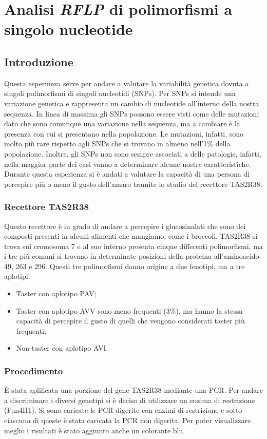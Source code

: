 \section*{Analisi \emph{RFLP} di polimorfismi a singolo nucleotide}

	\subsection*{Introduzione}
	Questa esperineza serve per andare a valutare la variabilità genetica dovuta a singoli polimorfismi di singoli nucleotidi (SNPs). Per SNPs si intende una variazione genetica e rappresenta un cambio di nucleotide all'interno della nostra sequenza. In linea di massima gli SNPs possono essere visti come delle mutazioni dato che sono comunque una variazione nella sequenza, ma a cambiare è la presenza con cui si presentano nella popolazione. Le mutazioni, infatti, sono molto più rare  rispetto agli SNPs che si trovano in almeno nell'1$\%$ della popolazione. Inoltre, gli SNPs non sono sempre associati a delle patologie, infatti, nella maggior parte dei casi vanno a determinare alcune nostre caratteristiche. 
	Durante questa esperienza si è andati a valutare la capacità di una persona di percepire più o meno il gusto dell'amaro tramite lo studio del recettore TAS2R38. 
	
	    \subsubsection*{Recettore TAS2R38}
	    Questo recettore è in grado di andare a percepire i glucosinalati che sono dei composti presenti in alcuni alimenti che mangiamo, come i broccoli. 
	    TAS2R38 si trova sul cromosoma 7 e al suo interno presenta cinque differenti polimorfismi, ma i tre più comuni si trovano in determinate posizioni della proteina all'aminoacido 49, 263 e 296. Questi tre polimorfismi danno origine a due fenotipi, ma a tre aplotipi: 
	    	\begin{itemize}
				\item Taster con aplotipo PAV;
				\item Taster con aplotipo AVV sono meno frequenti (3$\%$), ma hanno la stessa capacità di percepire il gusto di quelli che vengono considerati taster più frequenti;
				\item Non-taster con aplotipo AVI. 
			\end{itemize}
	
	    
	    \subsubsection*{Procedimento}
	    È stata aplificata una porzione del gene TAS2R38 mediante una PCR. Per andare a discriminare i diversi genotipi si è deciso di utilizzare un enzima di restrizione (Fun4H1). 
	    Si sono caricate le PCR digerite con enzimi di restrizione e sotto ciascuna di queste è stata caricata la PCR non digerita. Per poter visualizzare meglio i risultati è stato aggiunto anche un colorante blu. 
	   
